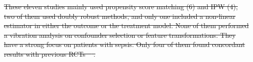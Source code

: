 \documentclass[10pt,letterpaper]{article}
\providecommand{\DIFdeltex}[1]{{\protect\color{red}\sout{#1}}}                      %
\providecommand{\DIFdelbegin}{} %
\providecommand{\DIFdelend}{} %
\providecommand{\DIFdel}[1]{\texorpdfstring{\DIFdeltex{#1}}{}} %
\newcommand{\DIFscaledelfig}{0.5}
\newlength{\DIFdelgraphicswidth} %
\newlength{\DIFdelgraphicsheight} %
\newcommand{\DIFdelincludegraphics}[2][]{%
\sbox{\DIFdelgraphicsbox}{\DIFOincludegraphics[#1]{#2}}%
\settoboxwidth{\DIFdelgraphicswidth}{\DIFdelgraphicsbox} %
\settoboxtotalheight{\DIFdelgraphicsheight}{\DIFdelgraphicsbox} %
\scalebox{\DIFscaledelfig}{%
\parbox[b]{\DIFdelgraphicswidth}{\usebox{\DIFdelgraphicsbox}\\[-\baselineskip] \rule{\DIFdelgraphicswidth}{0em}}\llap{\resizebox{\DIFdelgraphicswidth}{\DIFdelgraphicsheight}{%
\setlength{\unitlength}{\DIFdelgraphicswidth}%
\begin{picture}(1,1)%
\thicklines\linethickness{2pt} %
{\color[rgb]{1,0,0}\put(0,0){\framebox(1,1){}}}%
{\color[rgb]{1,0,0}\put(0,0){\line( 1,1){1}}}%
{\color[rgb]{1,0,0}\put(0,1){\line(1,-1){1}}}%
\end{picture}%
}\hspace*{3pt}}} %
} %
\DeclareRobustCommand{\DIFdelbegin}{\DIFOdelbegin \let\includegraphics\DIFdelincludegraphics} %
\DeclareRobustCommand{\DIFdelend}{\DIFOaddend \let\includegraphics\DIFOincludegraphics} %
\begin{document}

\DIFdelbegin \DIFdel{These eleven studies mainly used propensity score matching (6) and IPW (4), two of
  them used doubly robust methods, and only one included a non-linear estimator in
  either the outcome or the treatment model. None of them performed a vibration
  analysis on confounder selection or feature transformations. They have a
  strong focus on patients with sepsis. Only four of them found concordant results with
  previous RCTs \mbox{%
    \cite{liu2021effects,shahn2020fluid,adibuzzaman2019323}}\hskip0pt%
  .
}%
\DIFdelend %
\end{document}

